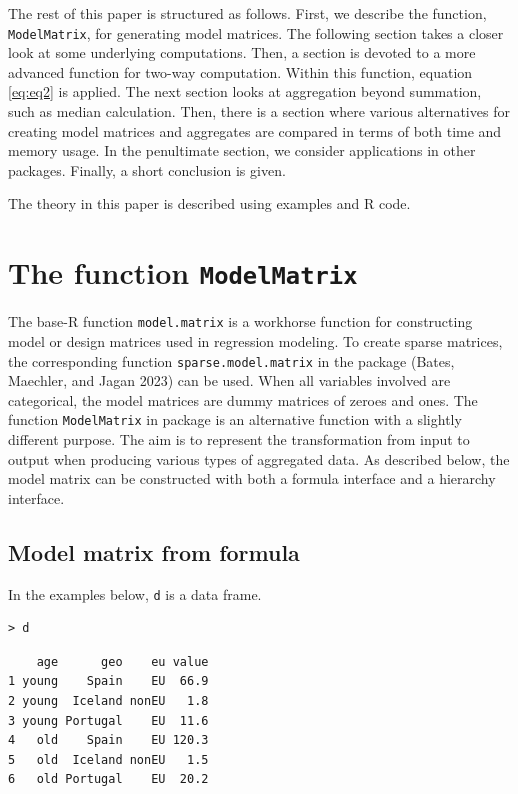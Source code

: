 The rest of this paper is structured as follows.
First, we describe the function, \texttt{ModelMatrix}, for generating model matrices.
The following section takes a closer look at some underlying computations.
Then, a section is devoted to a more advanced function for two-way computation. Within this function, equation \eqref{eq:eq2} is applied.
The next section looks at aggregation beyond summation, such as median calculation.
Then, there is a section where various alternatives for creating model matrices and aggregates are compared in terms of both time and memory usage.
In the penultimate section, we consider applications in other packages.
Finally, a short conclusion is given.

The theory in this paper is described using examples and R code.

\hypertarget{the-function-modelmatrix}{%
\section{\texorpdfstring{The function \texttt{ModelMatrix}}{The function ModelMatrix}}\label{the-function-modelmatrix}}

The base-R function \texttt{model.matrix} is a workhorse function for constructing model or design matrices used in regression modeling.
To create sparse matrices, the corresponding function \texttt{sparse.model.matrix} in the  package (Bates, Maechler, and Jagan 2023) can be used.
When all variables involved are categorical, the model matrices are dummy matrices of zeroes and ones.
The function \texttt{ModelMatrix} in package  is an alternative function with a slightly different purpose.
The aim is to represent the transformation from input to output when producing various types of aggregated data.
As described below, the model matrix can be constructed with both a formula interface and a hierarchy interface.

\hypertarget{model-matrix-from-formula}{%
\subsection{Model matrix from formula}\label{model-matrix-from-formula}}

In the examples below, \texttt{d} is a data frame.

\begin{verbatim}
> d
\end{verbatim}

\begin{verbatim}
    age      geo    eu value
1 young    Spain    EU  66.9
2 young  Iceland nonEU   1.8
3 young Portugal    EU  11.6
4   old    Spain    EU 120.3
5   old  Iceland nonEU   1.5
6   old Portugal    EU  20.2
\end{verbatim}

